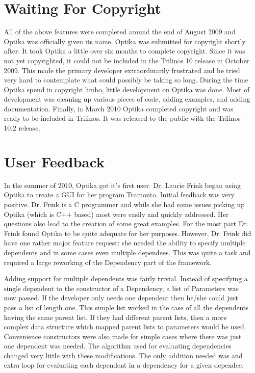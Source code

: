 \section{Waiting For Copyright}
	All of the above features were completed around the end of August 2009 and Optika was officially given its name.
	Optika was submitted for copyright shortly after. It took Optika a little over six months to complete copyright.
	Since it was not yet copyrighted, it could not be included in the Trilinos 10 release in October 2009. This made the primary developer extraordinarily
	frustrated and he tried very hard to contemplate what could possibly be taking so long. During the time Optika spend in copyright limbo, 
	little development on Optika was done. Most of development was cleaning up various pieces of code, adding examples, and adding documentation. 
	Finally, in March 2010 Optika completed copyright and was ready to be included in Trilinos. It was released to the public with the Trilinos 10.2 release.

\section{User Feedback}
In the summer of 2010, Optika got it's first user. Dr. Laurie Frink began using Optika to create a GUI for her program Tramonto.
Initial feedback was very positive. Dr. Frink is a C programmer and while she had some issues picking up Optika (which is C++ based)
most were easily and quickly addressed. Her questions also lead to the creation of some great examples. For the most part Dr. Frink found Optika
to be quite adequate for her purposes. However, Dr. Frink did have one rather major feature request: she needed the ability to 
specify multiple dependents and in some cases even multiple dependees. This was quite a task and required a large reworking of the
Dependency part of the framework. 

Adding support for multiple dependents was fairly trivial. Instead of specifying a single dependent to the constructor of a Dependency, a list
of Parameters was now passed. If the developer only needs one dependent then he/she could just pass a list of length one. This simple
list worked in the case of all the dependents having the same parent list. If they had different parent lists, then a more complex 
data structure which mapped parent lists to parameters would be used. Convenience constructors were also made for simple cases where
there was just one dependent was needed. The algorithm used for evaluating dependencies changed very little with these modifications. The only addition
needed was and extra loop for evaluating each dependent in a dependency for a given dependee.

